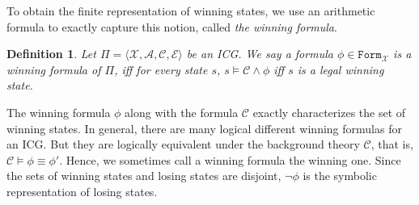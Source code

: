 \documentclass[review]{elsarticle}
\newcommand{\formula}{\mathtt{Form}}
\newcommand{\set}[1]{\{ #1 \}}
\newcommand{\tuple}[1]{\langle {#1} \rangle}
\newcommand{\statevar}{\mathcal{X}}
\newcommand{\winSet}{\mathcal{W}}
\newcommand{\act}{\mathcal{A}}
\newcommand{\constraint}{\mathcal{C}}
\newcommand{\estate}{\mathcal{E}}
\newcommand{\pre}{\mathtt{pre}}
\newcommand{\eff}{\mathtt{eff}}
\newcommand{\suc}{\tau}
\newcommand{\modulo}{\equiv}
\newcommand{\jumpZero}[1][]{\mathtt{JZ}(#1)}
\newtheorem{definition}{Definition}
\begin{document}
%			
%			
%		
	
	
    To obtain the finite representation of winning states, we use an arithmetic formula to exactly capture this notion, called \textit{the winning formula}.
	\begin{definition} \label{def:winForm} \rm
		Let $\Pi = \tuple{\statevar, \act, \constraint, \estate}$ be an ICG. %
		We say a formula $\phi \in \formula_{\statevar}$ is a \textit{winning formula} of $\Pi$, iff for every state $s$, $s \models \constraint \land \phi$ iff $s$ is a legal winning state.
	\end{definition}


	The winning formula $\phi$ along with the formula $\constraint$ exactly characterizes the set of winning states.
	In general, there are many logical different winning formulas for an ICG.
	But they are logically equivalent under the background theory $\constraint$, that is, $\constraint \models \phi \equiv \phi'$.
	Hence, we sometimes call a winning formula the winning one.
	Since the sets of winning states and losing states are disjoint, $\neg \phi$ is the symbolic representation of losing states.
	
\end{document}
